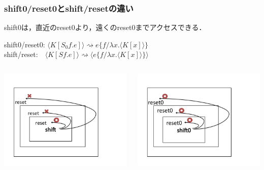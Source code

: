 \documentclass[dvipdfmx,cjk,xcolor=dvipsnames,envcountsect,notheorems,12pt,handout]{beamer} \usepackage{pgfpages} \pgfpagesuselayout{4 on 1}[a4paper,landscape,border shrink=5mm]
\theoremstyle{definition}
\begin{document}
\begin{frame}[fragile]
  \frametitle{shift0/reset0とshift/resetの違い}
  shift0は，直近のreset0より，遠くのreset0までアクセスできる．
  \begin{center}
    shift0/reset0: $\langle K [S_0 f.e] \rangle \rightsquigarrow e \{ f / \lambda x . \langle K [x] \rangle \}$\\
    shift/reset:  \,\,\,\,$\langle K [S f.e] \rangle \rightsquigarrow \langle e \{ f / \lambda x . \langle K [x] \rangle \} \rangle $
  \end{center}

  \begin{columns}
    \begin{column}{.5\textwidth}
      \includegraphics[clip,width=8cm]{./img/sr.png}
    \end{column}

    \begin{column}{.5\textwidth}
      \includegraphics[clip,width=8cm]{./img/s0r0.png}
    \end{column}
  \end{columns}


\end{frame}
\end{document}
